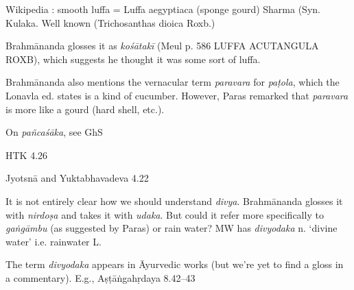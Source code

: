 \begin{ekdosis}
\begin{philcomm}[hp01_062]
Wikipedia : smooth luffa = Luffa aegyptiaca (sponge gourd)
Sharma (Syn. Kulaka. Well known (Trichosanthas dioica Roxb.)

Brahmānanda glosses it as \emph{kośātakī} (Meul p. 586 LUFFA ACUTANGULA ROXB), which suggests he thought it was some sort of luffa.

Brahmānanda also mentions the vernacular term \emph{paravara} for \emph{paṭola}, which the Lonavla ed. states is a kind of cucumber. However, Paras remarked that \emph{paravara} is more like a gourd (hard shell, etc.).

On \emph{pañcaśāka}, see GhS

\begin{versinnote}
\end{versinnote}

HTK 4.26

\begin{versinnote}
\end{versinnote}

Jyotsnā and Yuktabhavadeva 4.22

\begin{versinnote}
\end{versinnote}

It is not entirely clear how we should understand \emph{divya}. Brahmānanda glosses it with \emph{nirdoṣa} and takes it with \emph{udaka}. But could it refer more specifically to \emph{gaṅgāmbu} (as suggested by Paras) or rain water? MW has \emph{divyodaka} n. `divine water' i.e. rainwater L.

The term \emph{divyodaka} appears in Āyurvedic works (but we’re yet to find a gloss in a commentary). E.g.,
Aṣṭāṅgahṛdaya 8.42–43

\begin{versinnote}
\end{versinnote}


\end{philcomm}
\end{ekdosis}
